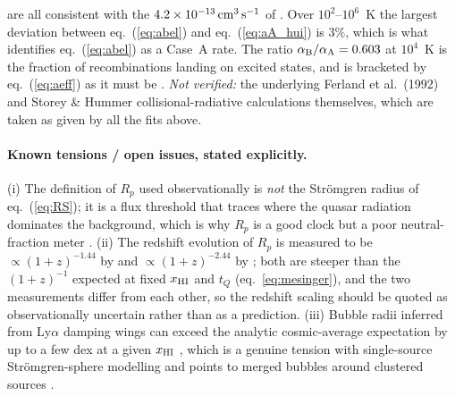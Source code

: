 \documentclass[11pt,a4paper]{article}
\newcommand{\aB}{\alpha_{\rm B}}
\newcommand{\aA}{\alpha_{\rm A}}
\newcommand{\cms}{\,{\rm cm^{3}\,s^{-1}}}
\begin{document}
\begin{enumerate}
      are all consistent with the $4.2\times10^{-13}\cms$ of \citet{Gnedin2022}. Over
      $10^2$--$10^6$~K the largest deviation between eq.~(\ref{eq:abel}) and eq.~(\ref{eq:aA_hui})
      is $3\%$, which is what identifies eq.~(\ref{eq:abel}) as a Case~A rate. The ratio
      $\aB/\aA=0.603$ at $10^4$~K is the fraction of recombinations landing on excited states, and
      is bracketed by eq.~(\ref{eq:aeff}) as it must be \citep{Nebrin2023}. \emph{Not verified:} the
      underlying Ferland et al.\ (1992) and Storey \& Hummer collisional-radiative calculations
      themselves, which are taken as given by all the fits above.
\end{enumerate}

\paragraph{Known tensions / open issues, stated explicitly.}
(i) The definition of $R_p$ used observationally \citep{Eilers2017} is \emph{not} the Str\"omgren
radius of eq.~(\ref{eq:RS}); it is a flux threshold that traces where the quasar radiation dominates
the background, which is why $R_p$ is a good clock but a poor neutral-fraction meter
\citep{Eilers2017,Bolton2007}.
(ii) The redshift evolution of $R_p$ is measured to be $\propto(1+z)^{-1.44}$ by \citet{Eilers2017}
and $\propto(1+z)^{-2.44}$ by \citet{Onorato2025}; both are steeper than the $(1+z)^{-1}$ expected at
fixed $x_{\rm HI}$ and $t_Q$ (eq.~\ref{eq:mesinger}), and the two measurements differ from each
other, so the redshift scaling should be quoted as observationally uncertain rather than as a
prediction.
(iii) Bubble radii inferred from Ly$\alpha$ damping wings can exceed the analytic cosmic-average
expectation by up to a few dex at a given $x_{\rm HI}$ \citep{Umeda2023}, which is a genuine tension
with single-source Str\"omgren-sphere modelling and points to merged bubbles around clustered sources
\citep{Umeda2023,Neyer2023,Furlanetto2004}.


\end{document}
